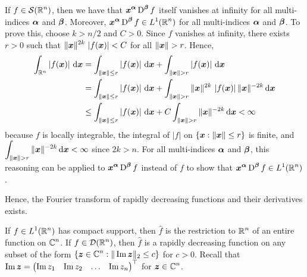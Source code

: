 If $\displaystyle f \in \mathcal{S}(\mathbb{R}^n)$, then we have that
$\displaystyle {\bm{x}}^{{\bm{\alpha}}} \operatorname{D}^{{\bm{\beta}}} f$ itself
vanishes at infinity for all multi-indices ${\bm{\alpha}}$ and ${\bm{\beta}}$.
Moreover,
$\displaystyle {\bm{x}}^{{\bm{\alpha}}}\operatorname{D}^{{\bm{\beta}}} f \in L^1(\mathbb{R}^n)$
for all multi-indices ${\bm{\alpha}}$ and ${\bm{\beta}}$.  To prove this, choose
$k > n/2$ and $C>0$.  Since $f$ vanishes at infinity, there exists $r>0$
such that
$\displaystyle \|{\bm{x}}\|^{2k}\, \left| f({\bm{x}}) \right| < C$ for
all $\|{\bm{x}}\| > r$.  Hence,
\begin{align*}
\int_{\RR^n} \left| f(\VEC{x})\right| \dx{\VEC{x}} &=
\int_{\|\VEC{x}\|\leq r} \left| f(\VEC{x})\right| \dx{\VEC{x}} +
\int_{\|\VEC{x}\|> r} \left| f(\VEC{x})\right| \dx{\VEC{x}} \\
&= \int_{\|\VEC{x}\|\leq r} \left| f(\VEC{x})\right| \dx{\VEC{x}} +
\int_{\|\VEC{x}\|> r} \|\VEC{x}\|^{2k}\,\left| f(\VEC{x})\right|
\|\VEC{x}\|^{-2k} \dx{\VEC{x}} \\
&\leq \int_{\|\VEC{x}\|\leq r} \left| f(\VEC{x})\right| \dx{\VEC{x}} +
C \int_{\|\VEC{x}\|> r} \|\VEC{x}\|^{-2k} \dx{\VEC{x}} < \infty
\end{align*}
because $f$ is locally integrable, the integral of $|f|$ on
$\{ {\bm{x}} : \|{\bm{x}}\| \leq r \}$ is finite, and\\
$\DS \int_{\|\VEC{x}\|> r} \|\VEC{x}\|^{-2k} \dx{\VEC{x}} < \infty$
since $2k >n$.  For all multi-indices ${\bm{\alpha}}$ and ${\bm{\beta}}$, this
reasoning can be applied to
$\displaystyle {\bm{x}}^{{\bm{\alpha}}} \operatorname{D}^{{\bm{\beta}}} f$ instead of $f$ to
show that
$\displaystyle {\bm{x}}^{{\bm{\alpha}}} \operatorname{D}^{{\bm{\beta}}} f \in L^1(\mathbb{R}^n)$.

Hence, the Fourier transform of rapidly decreasing functions and their
derivatives exists.

\begin{prop} \label{distr_four_f}
If $\displaystyle f \in L^1(\mathbb{R}^n)$ has compact support, then $\hat{f}$ is the
restriction to $\displaystyle \mathbb{R}^n$ of an entire function on
$\displaystyle \mathbb{C}^n$.  If
$\displaystyle f\in \mathcal{D}(\mathbb{R}^n)$, then $\hat{f}$ is a rapidly decreasing
function on any subset of the form
$\displaystyle \left\{ {\bm{z}}\in \mathbb{C}^n : \| \operatorname{Im} {\bm{z}} \|_2 \leq c \right\}$ 
for $c>0$.  Recall that
$\displaystyle \operatorname{Im} {\bm{z}} =
\begin{pmatrix} \operatorname{Im} z_1 & \operatorname{Im} z_2 & \ldots & \operatorname{Im} z_n \end{pmatrix}^\top$
for $\displaystyle {\bm{z}} \in \mathbb{C}^n$.
\end{prop}

